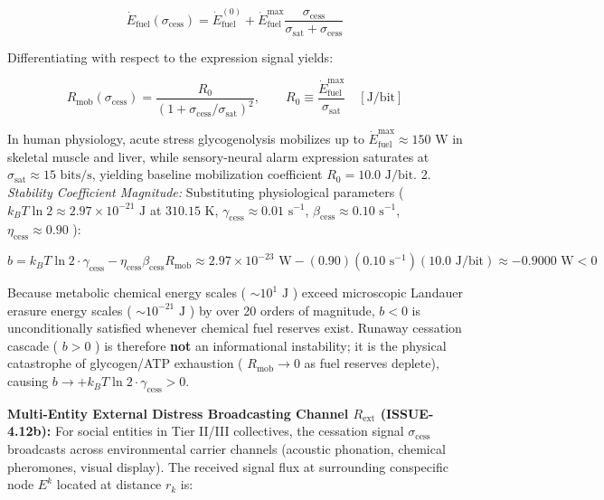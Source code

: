 \documentclass[11pt,a4paper]{article}
\theoremstyle{definition}
\theoremstyle{remark}
\begin{document}
\begin{equation}
\dot{E}_{\text{fuel}}(\sigma_{\text{cess}}) = \dot{E}_{\text{fuel}}^{(0)} + \dot{E}_{\text{fuel}}^{\max} \frac{\sigma_{\text{cess}}}{\sigma_{\text{sat}} + \sigma_{\text{cess}}}
\end{equation}


Differentiating with respect to the expression signal yields:


\begin{equation}
\boxed{R_{\text{mob}}(\sigma_{\text{cess}}) = \frac{R_0}{\left(1 + \sigma_{\text{cess}}/\sigma_{\text{sat}}\right)^2}, \qquad R_0 \equiv \frac{\dot{E}_{\text{fuel}}^{\max}}{\sigma_{\text{sat}}} \quad [\text{J/bit}]}
\end{equation}


In human physiology, acute stress glycogenolysis mobilizes up to $\dot{E}_{\text{fuel}}^{\max} \approx 150\text{ W}$ in skeletal muscle and liver, while sensory-neural alarm expression saturates at $\sigma_{\text{sat}} \approx 15\text{ bits/s}$, yielding baseline mobilization coefficient $R_0 = 10.0\text{ J/bit}$.
2. \textit{Stability Coefficient Magnitude:} Substituting physiological parameters ( $k_B T \ln 2 \approx 2.97 \times 10^{-21}\text{ J}$ at $310.15\text{ K}$, $\gamma_{\text{cess}} \approx 0.01\text{ s}^{-1}$, $\beta_{\text{cess}} \approx 0.10\text{ s}^{-1}$, $\eta_{\text{cess}} \approx 0.90$ ):


\begin{equation}
b = k_B T \ln 2 \cdot \gamma_{\text{cess}} - \eta_{\text{cess}}\beta_{\text{cess}} R_{\text{mob}} \approx 2.97 \times 10^{-23}\text{ W} - (0.90)(0.10\text{ s}^{-1})(10.0\text{ J/bit}) \approx -0.9000\text{ W} < 0
\end{equation}


Because metabolic chemical energy scales ( $\sim 10^1\text{ J}$ ) exceed microscopic Landauer erasure energy scales ( $\sim 10^{-21}\text{ J}$ ) by over 20 orders of magnitude, $b < 0$ is unconditionally satisfied whenever chemical fuel reserves exist. Runaway cessation cascade ( $b > 0$ ) is therefore \textbf{not} an informational instability; it is the physical catastrophe of glycogen/ATP exhaustion ( $R_{\text{mob}} \to 0$ as fuel reserves deplete), causing $b \to +k_B T \ln 2 \cdot \gamma_{\text{cess}} > 0$.

\textbf{Multi-Entity External Distress Broadcasting Channel $R_{\text{ext}}$ (ISSUE-4.12b):} For social entities in Tier II/III collectives, the cessation signal $\sigma_{\text{cess}}$ broadcasts across environmental carrier channels (acoustic phonation, chemical pheromones, visual display). The received signal flux at surrounding conspecific node $E^k$ located at distance $r_k$ is:
\end{document}
